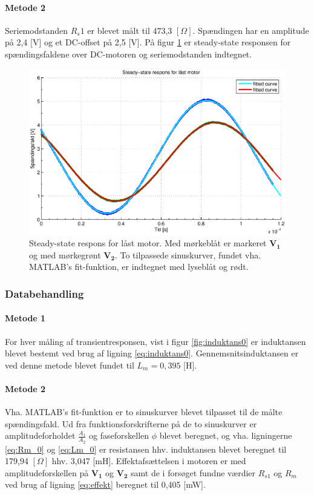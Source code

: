\paragraph{Metode 2}
Seriemodstanden \(R_s1\) er blevet målt til 473,3 \([\Omega]\).
Spændingen har en amplitude på 2,4 [V] og et DC-offset på 2,5 [V].
På figur \ref{fig:induktans1} er steady-state responsen for spændingsfaldene over DC-motoren og seriemodstanden indtegnet.
\begin{figure}[th!]
	\centering
	\includegraphics[width=1\textwidth]{./graphics/induktans1.eps}
	\caption[Steady-state respons for låst motor]
		{Steady-state respons for låst motor. Med mørkeblåt er markeret \(\mathbf{V_1}\) og med mørkegrønt \(\mathbf{V_2}\).
		To tilpassede sinuskurver, fundet vha. MATLAB's fit-funktion, er indtegnet med lyseblåt og rødt.}
	\label{fig:induktans1}
\end{figure}
\subsubsection{Databehandling}
\paragraph{Metode 1}
For hver måling af transientresponsen, vist i figur \ref{fig:induktans0} er induktansen blevet
bestemt ved brug af ligning \ref{eq:induktans0}.
Gennemsnitsinduktansen er ved denne metode blevet fundet til \(L_m=0,395\) [H].
\paragraph{Metode 2}
Vha. MATLAB's fit-funktion er to sinuskurver blevet tilpasset til de målte spændingsfald.
Ud fra funktionsforskrifterne på de to sinuskurver er amplitudeforholdet \(\frac{A_1}{A_2}\)
og faseforskellen \(\phi\) blevet beregnet,
og vha. ligningerne \ref{eq:Rm_0} og \ref{eq:Lm_0} er resistansen hhv. induktansen blevet beregnet til
179,94 \([\Omega]\) hhv. 3,047 [mH].
Effektafsættelsen i motoren er med amplitudeforskellen på \(\mathbf{V_1}\) og \(\mathbf{V_2}\) samt
de i forsøget fundne værdier \(R_{s1}\) og \(R_m\) ved brug af ligning \ref{eq:effekt} beregnet til 0,405 [mW].
